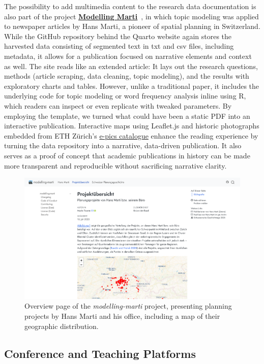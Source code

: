 \documentclass[final]{anthology-ch} %
\begin{document}
The possibility to add multimedia content to the research data documentation is also part of the project \href{https://mtwente.github.io/modelling-marti}{\textbf{Modelling Marti}}~\cite{twente2025b}, in which topic modeling was applied to newspaper articles by Hans Marti, a pioneer of spatial planning in Switzerland. While the GitHub repository behind the Quarto website again stores the harvested data consisting of segmented text in txt and csv files, including metadata, it allows for a publication focused on narrative elements and context as well. The site reads like an extended article: It lays out the research questions, methods (article scraping, data cleaning, topic modeling), and the results with exploratory charts and tables. However, unlike a traditional paper, it includes the underlying code for topic modeling or word frequency analysis inline using R, which readers can inspect or even replicate with tweaked parameters. By employing the template, we turned what could have been a static PDF into an interactive publication. Interactive maps using Leaflet.js and historic photographs embedded from ETH Zürich's \href{https://e-pics3.ethz.ch/de/home/}{e-pics catalogue} enhance the reading experience by turning the data repository into a narrative, data-driven publication. It also serves as a proof of concept that academic publications in history can be made more transparent and reproducible without sacrificing narrative clarity.

\begin{figure}[t!]
  \centering
  \includegraphics[width=0.9\linewidth]{figures/modelling_marti.png}
  \caption{Overview page of the \emph{modelling-marti} project, presenting planning projects by Hans Marti and his office, including a map of their geographic distribution.}
  \label{fig-modelling-marti}
\end{figure}

\subsection{Conference and Teaching Platforms}\label{conference-and-teaching-platforms}
\end{document}
